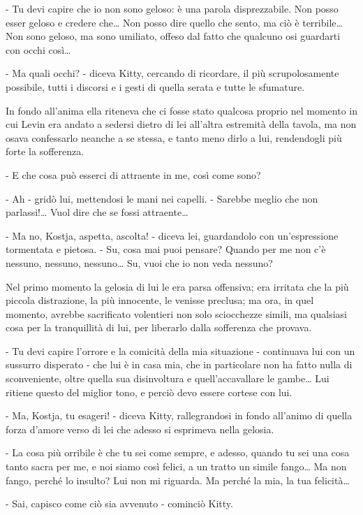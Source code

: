 - Tu devi capire che io non sono geloso: è una parola disprezzabile. Non posso esser geloso e credere che\ldots{} Non posso dire quello che sento, ma ciò è terribile\ldots{} Non sono geloso, ma sono umiliato, offeso dal fatto che qualcuno osi guardarti con occhi così\ldots{} 

- Ma quali occhi? - diceva Kitty, cercando di ricordare, il più scrupolosamente possibile, tutti i discorsi e i gesti di quella serata e tutte le sfumature. 

In fondo all'anima ella riteneva che ci fosse stato qualcosa proprio nel momento in cui Levin era andato a sedersi dietro di lei all'altra estremità della tavola, ma non osava confessarlo neanche a se stessa, e tanto meno dirlo a lui, rendendogli più forte la sofferenza. 

- E che cosa può esserci di attraente in me, così come sono? 

- Ah - gridò lui, mettendosi le mani nei capelli. - Sarebbe meglio che non parlassi!\ldots{} Vuol dire che se fossi attraente\ldots{} 

- Ma no, Kostja, aspetta, ascolta! - diceva lei, guardandolo con un'espressione tormentata e pietosa. - Su, cosa mai puoi pensare? Quando per me non c'è nessuno, nessuno, nessuno\ldots{} Su, vuoi che io non veda nessuno? 

Nel primo momento la gelosia di lui le era parsa offensiva; era irritata che la più piccola distrazione, la più innocente, le venisse preclusa; ma ora, in quel momento, avrebbe sacrificato volentieri non solo sciocchezze simili, ma qualsiasi cosa per la tranquillità di lui, per liberarlo dalla sofferenza che provava. 

- Tu devi capire l'orrore e la comicità della mia situazione - continuava lui con un sussurro disperato - che lui è in casa mia, che in particolare non ha fatto nulla di sconveniente, oltre quella sua disinvoltura e quell'accavallare le gambe\ldots{} Lui ritiene questo del miglior tono, e perciò devo essere cortese con lui. 

- Ma, Kostja, tu esageri! - diceva Kitty, rallegrandosi in fondo all'animo di quella forza d'amore verso di lei che adesso si esprimeva nella gelosia. 

- La cosa più orribile è che tu sei come sempre, e adesso, quando tu sei una cosa tanto sacra per me, e noi siamo così felici, a un tratto un simile fango\ldots{} Ma non fango, perché lo insulto? Lui non mi riguarda. Ma perché la mia, la tua felicità\ldots{} 

- Sai, capisco come ciò sia avvenuto - cominciò Kitty. 

